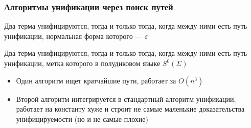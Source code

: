 \documentclass{beamer}
\begin{document}
\begin{frame}[fragile]
  \frametitle{Алгоритмы унификации через поиск путей}

\begin{center}
  Два терма унифицируются, тогда и только тогда, когда между ними есть путь унификации, нормальная форма которого --- $\varepsilon$
\end{center}

\begin{center}
  Два терма унифицируются, тогда и только тогда, когда между ними есть путь унификации, метка которого в полудиковом языке $S^0(\Sigma)$
\end{center}

\begin{itemize}
  \item Один алгоритм ищет кратчайшие пути, работает за $O(n^3)$
  \item Второй алгоритм интегрируется в стандартный алгоритм унификации, работает  на константу хуже и строит не самые маленькие доказательства унифицируемости (но и не самые плохие)
\end{itemize}
\end{frame}
\end{document}

